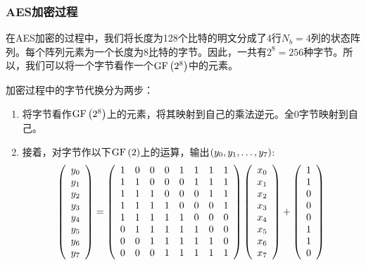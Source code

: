 \subsubsection{AES加密过程}
在AES加密的过程中，我们将长度为128个比特的明文分成了4行$N_b=4$列的状态阵列。每个阵列元素为一个长度为8比特的字节。因此，一共有$2^8=256$种字节。所以，我们可以将一个字节看作一个$\mathrm{GF}\left( {2^8}\right)$中的元素。\par
加密过程中的字节代换分为两步：
\begin{enumerate}
    \item 将字节看作$\mathrm{GF}\left( {2^8}\right)$上的元素，将其映射到自己的乘法逆元。全0字节映射到自己。
    \item 接着，对字节作以下$\mathrm{GF}\left( {2}\right)$上的运算，输出$\left( {y_0, y_1, \ldots ,y_7}\right)$:
    \begin{equation}
    \pth{\begin{array}{c}y_0\\y_1\\y_2\\y_3\\y_4\\y_5\\y_6\\y_7\end{array}}=\pth{
\begin{array}{cccccccc}
1     & 0     & 0     & 0     & 1     & 1     & 1     & 1 \\
1     & 1     & 0     & 0     & 0     & 1     & 1     & 1 \\
1     & 1     & 1     & 0     & 0     & 0     & 1     & 1 \\
1     & 1     & 1     & 1     & 0     & 0     & 0     & 1 \\
1     & 1     & 1     & 1     & 1     & 0     & 0     & 0 \\
0     & 1     & 1     & 1     & 1     & 1     & 0     & 0 \\
0     & 0     & 1     & 1     & 1     & 1     & 1     & 0 \\
0     & 0     & 0     & 1     & 1     & 1     & 1     & 1 \\
\end{array}%
}\pth{\begin{array}{c}x_0\\x_1\\x_2\\x_3\\x_4\\x_5\\x_6\\x_7\end{array}}+\pth{\begin{array}{c}1\\1\\0\\0\\0\\1\\1\\0\end{array}}
    \end{equation}
\end{enumerate}
